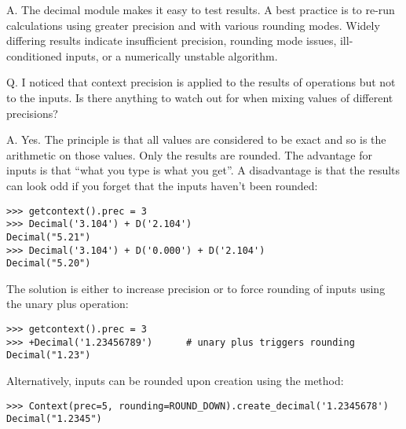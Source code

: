 A.  The decimal module makes it easy to test results.  A best practice is to
re-run calculations using greater precision and with various rounding modes.
Widely differing results indicate insufficient precision, rounding mode
issues, ill-conditioned inputs, or a numerically unstable algorithm.


Q.  I noticed that context precision is applied to the results of operations
but not to the inputs.  Is there anything to watch out for when mixing
values of different precisions?

A.  Yes.  The principle is that all values are considered to be exact and so
is the arithmetic on those values.  Only the results are rounded.  The
advantage for inputs is that ``what you type is what you get''.  A
disadvantage is that the results can look odd if you forget that the inputs
haven't been rounded:

\begin{verbatim}
>>> getcontext().prec = 3
>>> Decimal('3.104') + D('2.104')
Decimal("5.21")
>>> Decimal('3.104') + D('0.000') + D('2.104')
Decimal("5.20")
\end{verbatim}

The solution is either to increase precision or to force rounding of inputs
using the unary plus operation:

\begin{verbatim}
>>> getcontext().prec = 3
>>> +Decimal('1.23456789')      # unary plus triggers rounding
Decimal("1.23")
\end{verbatim}

Alternatively, inputs can be rounded upon creation using the
 method:

\begin{verbatim}
>>> Context(prec=5, rounding=ROUND_DOWN).create_decimal('1.2345678')
Decimal("1.2345")
\end{verbatim}
